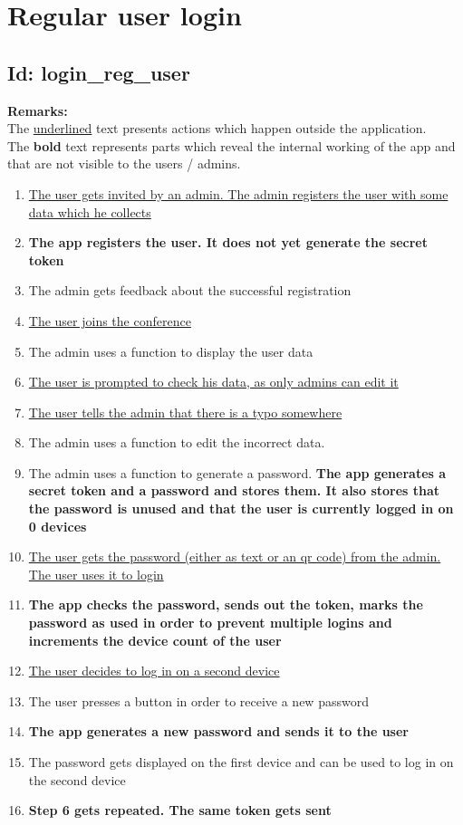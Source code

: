 \documentclass{article}
\begin{document}
\section*{Regular user login}
\subsection*{Id: login\_reg\_user}
\noindent
\textbf{Remarks:}\\
 The \underline{underlined} text presents actions which happen outside the application. \\
 The \textbf{bold} text represents parts which reveal the internal working of the app and that are not visible to the users / admins.
\begin{enumerate}
	\item \underline{The user gets invited by an admin. The admin registers the user with some data which he collects}
	\item \textbf{The app registers the user. It does not yet generate the secret token}
	\item The admin gets feedback about the successful registration
	\item \underline{The user joins the conference}
	\item The admin uses a function to display the user data
	\item \underline{The user is prompted to check his data, as only admins can edit it}
	\item \underline{The user tells the admin that there is a typo somewhere}
	\item The admin uses a function to edit the incorrect data.
	\item The admin uses a function to generate a password. \textbf{The app generates a secret token and a password and stores them. It also stores that the password is unused and that the user is currently logged in on 0 devices}
	\item \underline{The user gets the password (either as text or an qr code) from the admin. The user uses it to login} 
	\item \textbf{The app checks the password, sends out the token, marks the password as used in order to prevent multiple logins and increments the device count of the user}
	\item \underline{The user decides to log in on a second device}
	\item The user presses a button in order to receive a new password
	\item \textbf{The app generates a new password and sends it to the user}
	\item The password gets displayed on the first device and can be used to log in on the second device
	\item \textbf{Step 6 gets repeated. The same token gets sent}
\end{enumerate}
\end{document}
